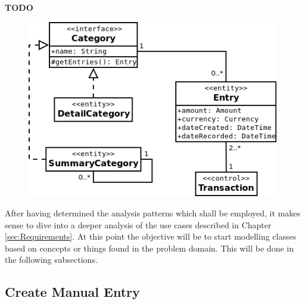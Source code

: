 \textbf{TODO}

\begin{figure}[ht!]
  \begin{center}
    \includegraphics[width=11cm]{./contents/img/Class_Diagram_-_Summary_Category.png}
  \end{center}
  \caption{}
  \label{fig:ClassDiagram.SummaryCategory}
\end{figure}
\FloatBarrier


After having determined the analysis patterns which shall be employed, it makes
sense to dive into a deeper analysis of the use cases described in Chapter
\ref{sec:Requirements}. At this point the objective will be to start modelling
classes based on concepts or things found in the problem domain. This will be
done in the following subsections.

\subsection{Create Manual Entry} \label{sec:AnalysisAndDesign.ManualEntry}

